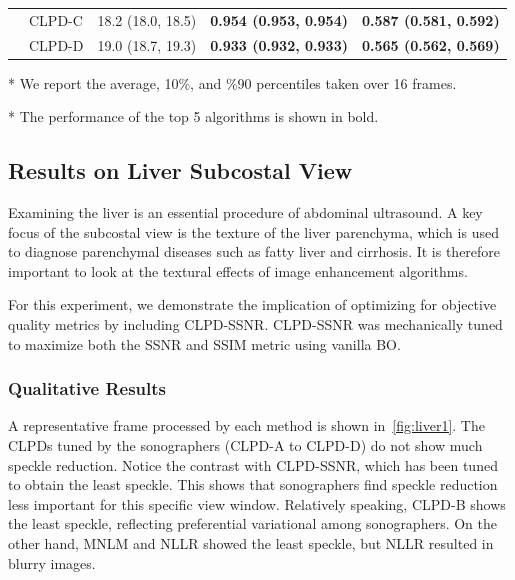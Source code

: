 \begin{table}
\begin{threeparttable}
\begin{tabular}{llrrr}
    & CLPD-C  & 18.2 {\tiny(18.0, 18.5)} & \textbf{0.954 {\tiny(0.953, 0.954)}} & \textbf{0.587 {\tiny(0.581, 0.592)}} \\
    & CLPD-D & 19.0 {\tiny(18.7, 19.3)} & \textbf{0.933 {\tiny(0.932, 0.933)}} &  \textbf{0.565 {\tiny(0.562, 0.569)}} \\\bottomrule
  \end{tabular}
  \begin{tablenotes}
    \item[*] We report the average, 10\%, and \%90 percentiles taken over 16 frames.
    \item[*] The performance of the top 5 algorithms is shown in bold.
  \end{tablenotes}
  \end{threeparttable}
  \vspace{-0.1in}
\end{table}
%
\subsection{Results on Liver Subcostal View}
Examining the liver is an essential procedure of abdominal ultrasound.
A key focus of the subcostal view is the texture of the liver parenchyma, which is used to diagnose parenchymal diseases such as fatty liver and cirrhosis.
It is therefore important to look at the textural effects of image enhancement algorithms.

For this experiment, we demonstrate the implication of optimizing for objective quality metrics by including CLPD-SSNR.
CLPD-SSNR was mechanically tuned to maximize both the SSNR and SSIM metric using vanilla BO.


%

\subsubsection{Qualitative Results}
A representative frame processed by each method is shown in~\cref{fig:liver1}.
The CLPDs tuned by the sonographers (CLPD-A to CLPD-D) do not show much speckle reduction.
Notice the contrast with CLPD-SSNR, which has been tuned to obtain the least speckle.
This shows that sonographers find speckle reduction less important for this specific view window.
Relatively speaking, CLPD-B shows the least speckle, reflecting preferential variational among sonographers.
On the other hand, MNLM and NLLR showed the least speckle, but NLLR resulted in blurry images.

